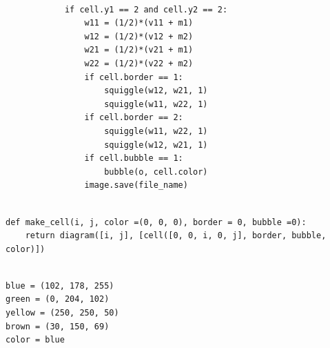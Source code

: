 \documentclass{book}
\newcounter{pcounter}
\begin{document}
\begin{center}
\begin{tcolorbox}[width=5in,colback={white},title={\begin{center}\texttt{Python \thepcounter} \addtocounter{pcounter}{1}  \end{center}},colbacktitle=Red,coltitle=black]
\begin{verbatim}

            if cell.y1 == 2 and cell.y2 == 2:
                w11 = (1/2)*(v11 + m1)
                w12 = (1/2)*(v12 + m2)
                w21 = (1/2)*(v21 + m1)
                w22 = (1/2)*(v22 + m2)
                if cell.border == 1:
                    squiggle(w12, w21, 1)
                    squiggle(w11, w22, 1)
                if cell.border == 2:
                    squiggle(w11, w22, 1)
                    squiggle(w12, w21, 1)
                if cell.bubble == 1:
                    bubble(o, cell.color)
                image.save(file_name)

\end{verbatim}%
\end{tcolorbox}
\end{center}

\begin{center}
\begin{tcolorbox}[width=5in,colback={white},title={\begin{center}\texttt{Python \thepcounter} \addtocounter{pcounter}{1}  \end{center}},colbacktitle=Red,coltitle=black]
\begin{verbatim}

def make_cell(i, j, color =(0, 0, 0), border = 0, bubble =0):
    return diagram([i, j], [cell([0, 0, i, 0, j], border, bubble, color)])   

\end{verbatim}%
\end{tcolorbox}
\end{center}

\begin{center}
\begin{tcolorbox}[width=5in,colback={white},title={\begin{center}\texttt{Python \thepcounter} \addtocounter{pcounter}{1}  \end{center}},colbacktitle=Red,coltitle=black]
\begin{verbatim}

blue = (102, 178, 255)
green = (0, 204, 102)
yellow = (250, 250, 50)
brown = (30, 150, 69)
color = blue

\end{verbatim}%
\end{tcolorbox}
\end{center}
\end{document}
